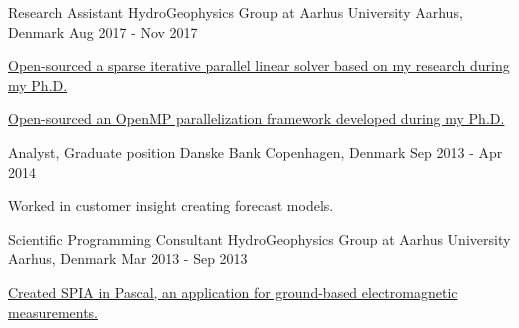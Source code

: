\begin{cventries}
  \cventry
    {Research Assistant} %
    {HydroGeophysics Group at Aarhus University} %
    {Aarhus, Denmark} %
    {Aug 2017 - Nov 2017} %
    {
      \begin{cvitems} %
        \item {\href{https://github.com/tueboesen/Sparse-iterative-parallel-linear-solver}{Open-sourced a sparse iterative parallel linear solver based on my research during my Ph.D.}}
        \item {\href{https://github.com/tueboesen/Parallelization-Framework}{Open-sourced an OpenMP parallelization framework developed during my Ph.D.}}
      \end{cvitems}
    }

  \cventry
    {Analyst, Graduate position} %
    {Danske Bank} %
    {Copenhagen, Denmark} %
    {Sep 2013 - Apr 2014} %
    {
      \begin{cvitems} %
        \item {Worked in customer insight creating forecast models.}
      \end{cvitems}
    }

  \cventry
    {Scientific Programming Consultant} %
    {HydroGeophysics Group at Aarhus University} %
    {Aarhus, Denmark} %
    {Mar 2013 - Sep 2013} %
    {
      \begin{cvitems} %
        \item {\href{https://hgg.au.dk/software/spia}{Created SPIA in Pascal, an application for ground-based electromagnetic measurements.}}
      \end{cvitems}
    }


\end{cventries}
